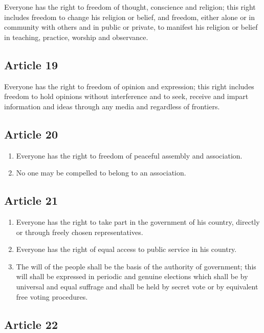 \documentclass[
  titlepage,
  openright,
  DIV=calc,
  toc=listof,
  listof=nochaptergap]{scrbook}
\begin{document}
Everyone has the right to freedom of thought, conscience and religion;
this right includes freedom to change his religion or belief, and
freedom, either alone or in community with others and in public or
private, to manifest his religion or belief in teaching, practice,
worship and observance.

\subsection{Article 19}\label{article-19}

Everyone has the right to freedom of opinion and expression; this right
includes freedom to hold opinions without interference and to seek,
receive and impart information and ideas through any media and
regardless of frontiers.

\subsection{Article 20}\label{article-20}

\begin{enumerate}
\def\labelenumi{\arabic{enumi}.}
\item
  Everyone has the right to freedom of peaceful assembly and
  association.
\item
  No one may be compelled to belong to an association.
\end{enumerate}

\subsection{Article 21}\label{article-21}

\begin{enumerate}
\def\labelenumi{\arabic{enumi}.}
\item
  Everyone has the right to take part in the government of his country,
  directly or through freely chosen representatives.
\item
  Everyone has the right of equal access to public service in his
  country.
\item
  The will of the people shall be the basis of the authority of
  government; this will shall be expressed in periodic and genuine
  elections which shall be by universal and equal suffrage and shall be
  held by secret vote or by equivalent free voting procedures.
\end{enumerate}

\subsection{Article 22}\label{article-22}
\end{document}
